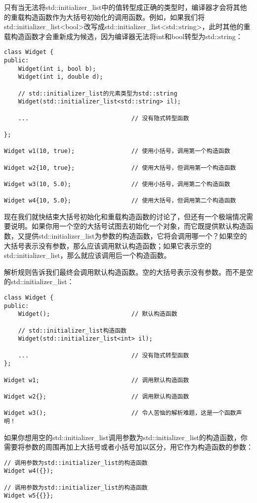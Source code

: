 只有当无法将std::initializer\_list中的值转型成正确的类型时，编译器才会将其他的重载构造函数作为大括号初始化的调用函数。例如，如果我们将std::initializer\_list<bool>改写成std::initializer\_list<std::string>，此时其他的重载构造函数才会重新成为候选，因为编译器无法将int和bool转型为std::string：

\begin{lstlisting}
class Widget {
public:
	Widget(int i, bool b);
	Widget(int i, double d);

	// std::initializer_list的元素类型为std::string
	Widget(std::initializer_list<std::string> il);

	...								// 没有隐式转型函数

};

Widget w1(10, true); 				// 使用小括号，调用第一个构造函数

Widget w2{10, true}; 				// 使用大括号，但调用第一个构造函数

Widget w3(10, 5.0); 				// 使用小括号，调用第二个构造函数

Widget w4{10, 5.0}; 				// 使用大括号，但调用第二个构造函数
\end{lstlisting}

现在我们就快结束大括号初始化和重载构造函数的讨论了，但还有一个极端情况需要说明。如果你用一个空的大括号试图去初始化一个对象，而它既提供默认构造函数，又提供std::initializer\_list为参数的构造函数，它将会调用哪一个？如果空的大括号表示没有参数，那么应该调用默认构造函数；如果它表示空的std::initializer\_list，那么就应该调用后一个构造函数。

解析规则告诉我们最终会调用默认构造函数。空的大括号表示没有参数。而不是空的std::initializer\_list：

\begin{lstlisting}
class Widget {
public:
	Widget();						// 默认构造函数

	// std::initializer_list构造函数
	Widget(std::initializer_list<int> il); 	

	...								// 没有隐式转型函数
};

Widget w1; 							// 调用默认构造函数

Widget w2{}; 						// 调用默认构造函数

Widget w3(); 						// 令人苦恼的解析难题，这是一个函数声明！
\end{lstlisting}

如果你想用空的std::initializer\_list调用参数为std::initializer\_list的构造函数，你需要将参数的周围再加上大括号或者小括号加以区分，用它作为构造函数的参数：

\begin{lstlisting}
// 调用参数为std::initializer_list的构造函数
Widget w4({}); 					

// 调用参数为std::initializer_list的构造函数
Widget w5{{}}; 					
\end{lstlisting}

